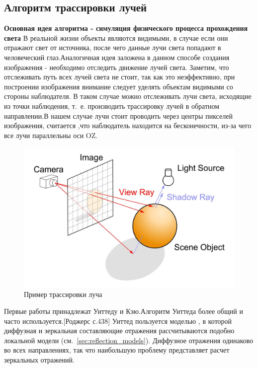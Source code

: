 \documentclass[a4paper,14pt,unknownkeysallowed]{extreport}
\begin{document}
\subsection{Алгоритм трассировки лучей}
\label{sec:ray_tracing}
\textbf{Основная идея алгоритма - симуляция физического процесса прохождения света} \newline
В реальной жизни объекты являются видимыми, в случае если они отражают свет от источника, после чего данные лучи света попадают в человеческий глаз.Аналогичная идея заложена в данном способе создания изображения - необходимо отследить движение лучей света.
Заметим, что отслеживать путь всех лучей света не стоит, так как это неэффективно, при построении изображения внимание следует уделять объектам видимыми со стороны наблюдателя.
В таком случае можно отслеживать лучи света, исходящие из точки наблюдения, т.~е. производить трассировку лучей в обратном направлении.В нашем случае лучи стоит проводить через центры пикселей изображения,
считается ,что наблюдатель находится на бесконечности, из-за чего все лучи параллельны оси OZ.\cite{Rodgers,modern_ray_tracing}

\begin{figure}[h]
	\centering
	\includegraphics[scale=0.4]{ray_tracing.jpg}
	\caption{Пример трассировки луча}
	\label{fig:alg_ray_tracing}
\end{figure} 

Первые работы принадлежат Уиттеду и Кэю.Алгоритм Уиттеда более общий и часто используется.[Роджерс с.438]
Уиттед пользуется моделью , в которой диффузная и зеркальная составляющие отражения рассчитываются подобно локальной модели (см.~\ref{sec:reflection_models}).
Диффузное отражения одинаково во всех направлениях, так что наибольшую проблему представляет расчет зеркальных отражений.\cite{Rodgers}
\end{document}
